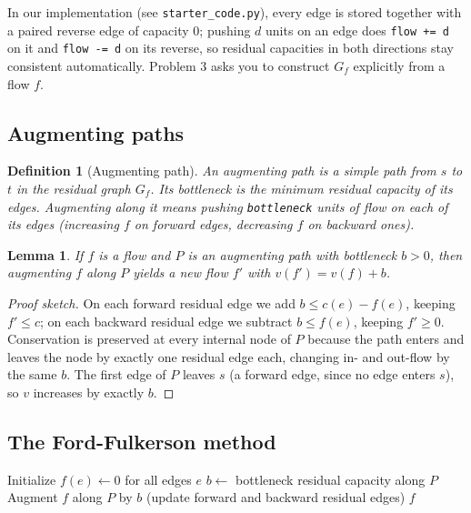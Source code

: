 \documentclass[11pt]{article}
\newtheorem{lemma}[theorem]{Lemma}
\newtheorem{definition}[theorem]{Definition}
\begin{document}
In our implementation (see \texttt{starter\_code.py}), every edge is stored together with
a paired reverse edge of capacity $0$; pushing $d$ units on an edge does \texttt{flow +=
d} on it and \texttt{flow -= d} on its reverse, so residual capacities in both directions
stay consistent automatically. Problem 3 asks you to construct $G_f$ explicitly from a
flow $f$.

\subsection{Augmenting paths}

\begin{definition}[Augmenting path]
An \emph{augmenting path} is a simple path from $s$ to $t$ in the residual graph $G_f$.
Its \emph{bottleneck} is the minimum residual capacity of its edges. \emph{Augmenting}
along it means pushing \texttt{bottleneck} units of flow on each of its edges (increasing
$f$ on forward edges, decreasing $f$ on backward ones).
\end{definition}

\begin{lemma}
\label{lem:augment-valid}
If $f$ is a flow and $P$ is an augmenting path with bottleneck $b > 0$, then augmenting
$f$ along $P$ yields a new flow $f'$ with $v(f') = v(f) + b$.
\end{lemma}

\begin{proof}[Proof sketch]
On each forward residual edge we add $b \le c(e) - f(e)$, keeping $f' \le c$; on each
backward residual edge we subtract $b \le f(e)$, keeping $f' \ge 0$. Conservation is
preserved at every internal node of $P$ because the path enters and leaves the node by
exactly one residual edge each, changing in- and out-flow by the same $b$. The first edge
of $P$ leaves $s$ (a forward edge, since no edge enters $s$), so $v$ increases by exactly
$b$.
\end{proof}

\subsection{The Ford-Fulkerson method}

\begin{algorithm}[h]
\caption{Ford-Fulkerson (generic augmenting-path method)}
\begin{algorithmic}[1]
\State Initialize $f(e) \gets 0$ for all edges $e$
    \State $b \gets$ bottleneck residual capacity along $P$
    \State Augment $f$ along $P$ by $b$ (update forward and backward residual edges)
\EndWhile
\State \Return $f$
\end{algorithmic}
\end{algorithm}
\end{document}
